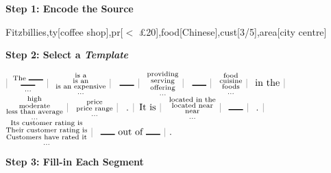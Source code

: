 \begin{frame}
  \begin{center}
  \end{center}

\textbf{Step 1: Encode the Source}

\begin{small}
Fitzbillies,ty[coffee shop],pr[$<$ \pounds 20],food[Chinese],cust[3/5],area[city centre]
\end{small}

\pause
\air
\textbf{Step 2: Select a \textit{Template}}

    \begin{center}

$\textcolor{gray}{|} $ $ \substack{\text{The \rule{15pt}{1pt}}\\\text{\rule{15pt}{1pt}}\\ \dots}
\ \textcolor{gray}{|} \  $ $ \substack{\text{is a}\\\text{is an}\\\text{is an expensive}\\ \dots}
\ \textcolor{gray}{|} \  $ $ \text{\rule{15pt}{1pt}} \ \textcolor{gray}{|} \  $ $ \substack{\text{providing}\\\text{serving}\\\text{offering}\\ \dots}
\ \textcolor{gray}{|} \  $ $ \text{\rule{15pt}{1pt}} \ \textcolor{gray}{|} \  $ $ \substack{\text{food}\\\text{cuisine}\\\text{foods}\\ \dots}
\ \textcolor{gray}{|} \  $ $ \text{in the} \ \textcolor{gray}{|} \  $ $ \substack{\text{high}\\\text{moderate}\\\text{less than average}\\ \dots}
\ \textcolor{gray}{|} \  $ $ \substack{\text{price}\\\text{price range}\\ \dots}
\ \textcolor{gray}{|} \  $ $ \text{.}$ $\textcolor{gray}{|}$ $ \text{It is} \ \textcolor{gray}{|} \  $ $ \substack{\text{located in the}\\\text{located near}\\\text{near}\\ \dots}
\ \textcolor{gray}{|} \  $ $ \text{\rule{15pt}{1pt}} \ \textcolor{gray}{|} \  $ $ \text{.}$ $ \textcolor{gray}{|} \  $ $ \substack{\text{Its customer rating is}\\\text{Their customer rating is}\\\text{Customers have rated it}\\ \dots}
\ \textcolor{gray}{|} \  $ $ \text{\rule{15pt}{1pt} out of \rule{15pt}{1pt}} \ \textcolor{gray}{|} \  .$
    \end{center}
\pause
\air
\textbf{Step 3: Fill-in Each Segment}
    \air



\end{frame}
